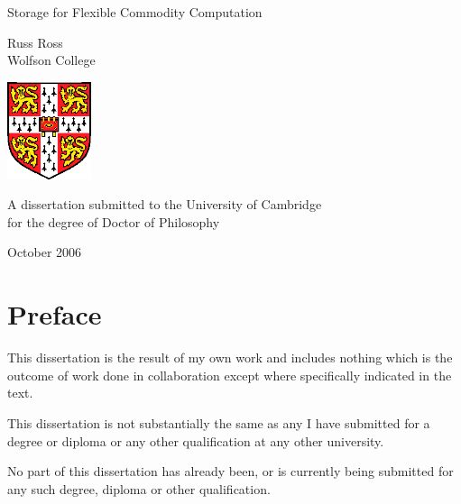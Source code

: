 
\pagestyle{empty}
\begin{titlepage}
\begin{center}
\vspace*{\fill}

\huge
Storage for Flexible Commodity Computation

\vfill
\vfill

\huge
Russ Ross\\[6mm]
\large
Wolfson College

\vfill
\includegraphics[width=70pt]{eps/camshield}
\vfill

\large
A dissertation submitted to the University of Cambridge\\
for the degree of Doctor of Philosophy

\vfill

October 2006

\vspace*{\fill}
\end{center}
\end{titlepage}
\cleardoublepage



\chapter*{Preface}

\noindent This dissertation is the result of my own work and
includes nothing which is the outcome of work done in collaboration
except where specifically indicated in the text.

\noindent This dissertation is not substantially the same as any I
have submitted for a degree or diploma or any other qualification at
any other university.

\noindent No part of this dissertation has already been, or is
currently being submitted for any such degree, diploma or other
qualification.


